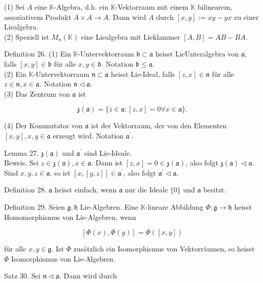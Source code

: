\documentclass[10pt, letterpaper]{article}
\begin{document}
(1) Sei $A$ eine $\mathbb{K}$-Algebra, d.h. ein $\mathbb{K}$-Vektorraum mit einem $\mathbb{K}$ bilinearem, assoziativem Produkt $A \times A \rightarrow A$. Dann wird $A$ durch $[x, y]:=x y-y x$ zu einer Liealgebra.\\
(2) Speziell ist $M_{n}(\mathbb{K})$ eine Liealgebra mit Lieklammer $[A, B]= A B-B A$.

Definition 26. (1) Ein $\mathbb{K}$-Untervektorraum $\mathfrak{b} \subset \mathfrak{a}$ heisst LieUnteralgebra von $\mathfrak{a}$, falls $[x, y] \in \mathfrak{b}$ für alle $x, y \in \mathfrak{b}$. Notation $\mathfrak{b} \leq \mathfrak{a}$.\\
(2) Ein $\mathbb{K}$-Untervektorraum $\mathfrak{n} \subset \mathfrak{a}$ heisst Lie-Ideal, falls $[z, x] \in \mathfrak{n}$ für alle $z \in \mathfrak{n}, x \in \mathfrak{a}$. Notation $\mathfrak{n} \triangleleft \mathfrak{a}$.\\
(3) Das Zentrum von $\mathfrak{a}$ ist

$$
\mathfrak{z}(\mathfrak{a})=\{z \in \mathfrak{a}:[z, x]=0 \forall x \in \mathfrak{a}\} .
$$

(4) Der Kommutator von $\mathfrak{a}$ ist der Vektorraum, der von den Elementen $[x, y], x, y \in \mathfrak{a}$ erzeugt wird. Notation $\mathfrak{a}^{\prime}$.

Lemma 27. $\mathfrak{z}(\mathfrak{a})$ und $\mathfrak{a}^{\prime}$ sind Lie-Ideale.\\
Beweis. Sei $z \in \mathfrak{z}(\mathfrak{a}), x \in \mathfrak{a}$. Dann ist $[z, x]=0 \in \mathfrak{z}(\mathfrak{a})$, also folgt $\mathfrak{z}(\mathfrak{a}) \triangleleft \mathfrak{a}$. Sind $x, y, z \in \mathfrak{a}$, so ist $[x,[y, z]] \in \mathfrak{a}^{\prime}$, also folgt $\mathfrak{a}^{\prime} \triangleleft \mathfrak{a}$.

Definition 28. $\mathfrak{a}$ heisst einfach, wenn $\mathfrak{a}$ nur die Ideale $\{0\}$ und $\mathfrak{a}$ besitzt.

Definition 29. Seien $\mathfrak{g}, \mathfrak{h}$ Lie-Algebren. Eine $\mathbb{K}$-lineare Abbildung $\Phi: \mathfrak{g} \rightarrow \mathfrak{h}$ heisst Homomorphismus von Lie-Algebren, wenn

$$
[\Phi(x), \Phi(y)]=\Phi([x, y])
$$

für alle $x, y \in \mathfrak{g}$. Ist $\Phi$ zusätzlich ein Isomorphismus von Vektorräumen, so heisst $\Phi$ Isomorphismus von Lie-Algebren.

Satz 30. Sei $\mathfrak{n} \triangleleft \mathfrak{a}$. Dann wird durch
\end{document}

